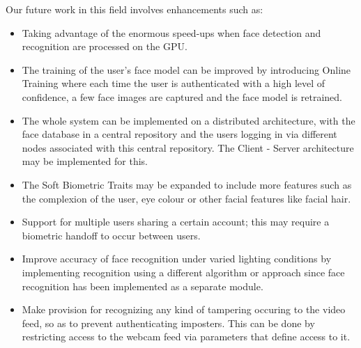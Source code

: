 \documentclass[%
        final,
        notitlepage,
        narroweqnarray,
        inline,
        ]{ieee}
\begin{document}
Our future work in this field involves enhancements such as:
\begin{itemize}
\item Taking advantage of the enormous speed-ups when face detection and recognition are processed on the GPU.
\item The training of the user's face model can be improved by introducing Online Training where each time the user is authenticated with a high level of confidence, a few face images are captured and the face model is retrained.
\item The whole system can be implemented on a distributed architecture, with the face database in a central repository and the users logging in via different nodes associated with this central repository. The Client - Server architecture may be implemented for this.
\item The Soft Biometric Traits may be expanded to include more features such as the complexion of the user, eye colour or other facial features like facial hair. 
\item Support for multiple users sharing a certain account; this may require a biometric handoff\cite{Klos00} to occur between users.
\item Improve accuracy of face recognition under varied lighting conditions by implementing recognition using a different algorithm or approach since face recognition has been implemented as a separate module.
\item Make provision for recognizing any kind of tampering occuring to the video feed, so as to prevent authenticating imposters. This can be done by restricting access to the webcam feed via parameters that define access to it.
\end{itemize}


\end{document}
